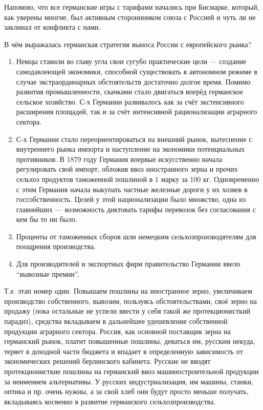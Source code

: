 Напомню, что все германские игры с тарифами начались при Бисмарке, который,
как уверены многие, был активным стороннником союза с Россией и чуть ли не
заклинал от конфликта с нами.

В чём выражалась германская стратегия выноса России с европейского рынка?

\begin{enumerate}
\item Немцы ставили во главу угла свои сугубо практические цели --- создание
самодавлеющей экономики, способной существовать в автономном режиме в случае
экстраординарных обстоятельств достаточно долгое время. Помимо развития
промышленности, скачками стало двигаться вперёд германское сельское хозяйство.
С-х Германии развивалось как за счёт экстенсивного расширения площадей, так и за
счёт интенсивной рационализации аграрного сектора.

\item С-х Германии стало переориентироваться на внешний рынок, вытеснение с
внутреннего рынка импорта и наступление на экономики потенциальных противников.
В 1879 году Германия впервые искусственно начала регулировать свой импорт,
обложив ввоз иностранного зерна и прочих сельхоз продуктов таможенной пошлиной
в 1 марку за 100 кг. Одновременно с этим Германия начала выкупать частные
железные дороги у их хозяев в госсобственность. Целей у этой национализации
было множство, одна из главнейших --- возможность диктовать тарифы перевозок
без согласования с кем бы то ни было.

\item Проценты от таможенных сборов шли немецким сельхозпроизводятелям для
поощрения производства.

\item Для производителей и экспортных фирм правительство Германии ввело
\enquote{вывозные премии}.
\end{enumerate}

Т.е. этап номер один. Повышаем пошлины на иностранное зерно, увеличиваем
производство собственного, вывозим, пользуясь обстоятельствами, своё зерно на
продажу (пока остальные не успели ввести у себя такой же протекционисткий
парадиз), средства вкладываем в дальнейшее удешевление собственной продукции
аграрного сектора. Россия, как основной поставщик зерна на германский рынок,
платит повышенные пошлины, деваться им, русским некуда, теряет в доходной части
бюджета и впадает в определенную зависимость от экономических решений
берлинского кабинета. Русские не вводят протекционисткие пошлины на германский
ввоз машиностроительной продукции за неимением альтернативы. У русских
индустриализация, им машины, станки, оптика и пр. очень нужны, а за свой хлеб
они будут просто меньше получать, вкладываясь косвенно в развитие германского
сельхозпроизводства.

